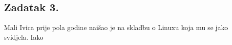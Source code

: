 \documentclass{exam}
\begin{document}
                                                                                                                                \subsection*{Zadatak
                                                                                                                                3.}
                                                                                                                                Mali
                                                                                                                                Ivica
                                                                                                                                prije
                                                                                                                                pola
                                                                                                                                godine
                                                                                                                                naišao
                                                                                                                                je
                                                                                                                                na
                                                                                                                                skladbu
                                                                                                                                o
                                                                                                                                Linuxu
                                                                                                                                koja
                                                                                                                                mu
                                                                                                                                se
                                                                                                                                jako
                                                                                                                                svidjela.
                                                                                                                                Iako
\end{document}
